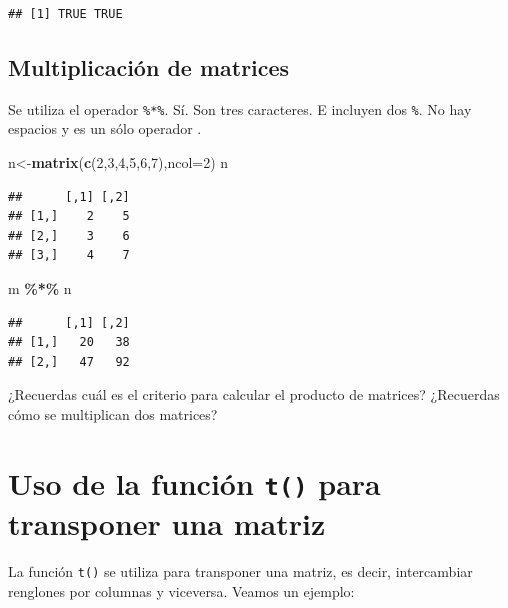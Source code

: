 \documentclass[
]{book}
\newenvironment{Shaded}{\begin{snugshade}}{\end{snugshade}}
\newcommand{\AttributeTok}[1]{\textcolor[rgb]{0.13,0.29,0.53}{#1}}
\newcommand{\DecValTok}[1]{\textcolor[rgb]{0.00,0.00,0.81}{#1}}
\newcommand{\FunctionTok}[1]{\textcolor[rgb]{0.13,0.29,0.53}{\textbf{#1}}}
\newcommand{\NormalTok}[1]{#1}
\newcommand{\OtherTok}[1]{\textcolor[rgb]{0.56,0.35,0.01}{#1}}
\newcommand{\SpecialCharTok}[1]{\textcolor[rgb]{0.81,0.36,0.00}{\textbf{#1}}}
\begin{document}
\begin{verbatim}
## [1] TRUE TRUE
\end{verbatim}

\subsection{Multiplicación de matrices}\label{multiplicaciuxf3n-de-matrices}

Se utiliza el operador \texttt{\%*\%}. Sí. Son tres caracteres. E incluyen dos \texttt{\%}.
No hay espacios y es un sólo operador .

\begin{Shaded}
\begin{Highlighting}[]
\NormalTok{n}\OtherTok{\textless{}{-}}\FunctionTok{matrix}\NormalTok{(}\FunctionTok{c}\NormalTok{(}\DecValTok{2}\NormalTok{,}\DecValTok{3}\NormalTok{,}\DecValTok{4}\NormalTok{,}\DecValTok{5}\NormalTok{,}\DecValTok{6}\NormalTok{,}\DecValTok{7}\NormalTok{),}\AttributeTok{ncol=}\DecValTok{2}\NormalTok{)}
\NormalTok{n}
\end{Highlighting}
\end{Shaded}

\begin{verbatim}
##      [,1] [,2]
## [1,]    2    5
## [2,]    3    6
## [3,]    4    7
\end{verbatim}

\begin{Shaded}
\begin{Highlighting}[]
\NormalTok{m }\SpecialCharTok{\%*\%}\NormalTok{ n }
\end{Highlighting}
\end{Shaded}

\begin{verbatim}
##      [,1] [,2]
## [1,]   20   38
## [2,]   47   92
\end{verbatim}

¿Recuerdas cuál es el criterio para calcular el producto de matrices?
¿Recuerdas cómo se multiplican dos matrices?

\section{\texorpdfstring{Uso de la función \texttt{t()} para transponer una matriz}{Uso de la función t() para transponer una matriz}}\label{uso-de-la-funciuxf3n-t-para-transponer-una-matriz}

La función \texttt{t()} se utiliza para transponer una matriz, es decir, intercambiar renglones por columnas y viceversa. Veamos un ejemplo:
\end{document}
